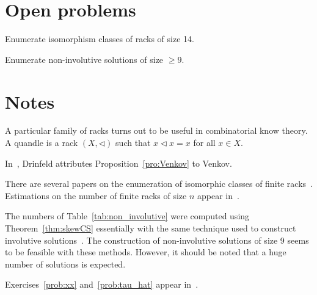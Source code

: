 \section*{Open problems}

\begin{problem}
\label{problem:racks14}
Enumerate isomorphism classes of racks of size 14. 
\end{problem}

\begin{problem}
Enumerate non-involutive solutions of size $\geq9$. 
\end{problem}


\section*{Notes}

A particular family of racks turns out to be useful in combinatorial know theory. A quandle
is a rack $(X,\triangleleft)$ such that $x\triangleleft x=x$ for all $x\in X$. 

In~\cite{MR1183474}, Drinfeld attributes Proposition~\ref{pro:Venkov} to Venkov. 

There are several papers on the enumeration of isomorphic classes of finite racks~\cite{MR3665565,MR3118951,MR3904151}. 
Estimations on the number of finite
racks of size $n$ appear in~\cite{MR3118951}. 

The numbers of Table~\ref{tab:non_involutive} were computed using 
Theorem~\ref{thm:skewCS} essentially with the same technique used to construct involutive solutions~\cite{AMV}. 
The construction of non-involutive solutions of size 9 seems to be feasible with these methods. 
However, it should be noted that a huge number of solutions is expected. 

Exercises~\ref{prob:xx} and~\ref{prob:tau_hat} appear in~\cite{MR3974961}. 

